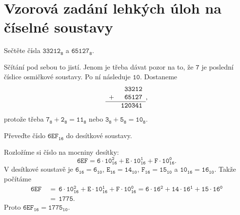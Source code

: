 \documentclass[a4paper,12pt,answers]{exam}
\begin{document}
\section*{Vzorová zadání lehkých úloh na číselné soustavy}

\begin{questions}
 \question Sečtěte čísla $\mathtt{33212_8}$ a $\mathtt{65127_8}$.
 \begin{solution}
  Sčítání pod sebou to jistí. Jenom je třeba dávat pozor na to, že $\mathtt{7}$
  je poslední číslice osmičkové soustavy. Po ní následuje $\mathtt{10}$.
  Dostaneme
  \[
   \begin{array}{rr}
    & \mathtt{33212} \\
    +& \mathtt{65127} \\
    \hline
     & \mathtt{120341}
   \end{array},
  \]
  protože třeba $\mathtt{7_8 + 2_8 = 11_8}$ nebo $\mathtt{3_8 + 5_8 = 10_8}$.
 \end{solution}

 \question Převeďte číslo $\mathtt{6EF_{16}}$ do desítkové soustavy.
 \begin{solution}
  Rozložíme si číslo na mocniny desítky:
  \[
   \mathtt{6EF = 6 \cdot 10_{16}^2 + E \cdot 10_{16}^{1} + F \cdot 10_{16}^{0}}.
  \]
  V desítkové soustavě je $\mathtt{6_{16} = 6_{10}}$, $\mathtt{E_{16} =
  14_{10}}$, $\mathtt{F_{16} = 15_{10}}$ a $\mathtt{10_{16} = 16_{10}}$. Takže
  počítáme
  \begin{align*}
   \mathtt{6EF}&~\mathtt{=\,6 \cdot 10_{16}^2 + E \cdot 10_{16}^{1} + F \cdot
   10_{16}^{0} = 6 \cdot 16^2 + 14 \cdot 16^{1} + 15 \cdot 16^{0}}\\
               &~\mathtt{=\,1775}.
  \end{align*}
  Proto $\mathtt{6EF_{16} = 1775_{10}}$.
 \end{solution}


\end{questions}
\end{document}
